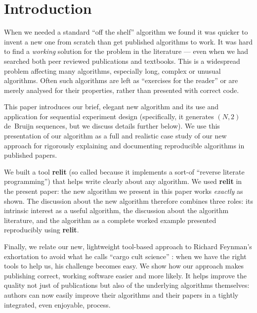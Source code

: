 \documentclass[preprint,times]{elsarticle}
\def\name#1{\textbf{#1}}
\begin{document}


\maketitle

\section{Introduction}
When we needed a standard ``off the shelf'' algorithm we found it was quicker to invent a new one from scratch than get published algorithms to work. It was hard to find a \emph{working\/} solution for the problem in the literature --- even when we had searched both peer reviewed publications and textbooks. This is a widespread problem affecting many algorithms, especially long, complex or unusual algorithms. Often such algorithms are left as ``exercises for the reader'' or are merely analysed for their properties, rather than presented with correct code.

This paper introduces our brief, elegant new algorithm and its use and application for sequential experiment design (specifically, it generates $(N,2)$ de~Bruijn sequences, but we discuss details further below). We use this presentation of our algorithm as a full and realistic case study of our new approach for rigorously explaining and documenting reproducible algorithms in published papers. 

We built a tool \name{relit} (so called because it implements a sort-of ``reverse literate programming'') that helps write clearly about any algorithm. We used \name{relit} in the present paper: the new algorithm we present in this paper works \emph{exactly\/} as shown. The discussion about the new algorithm therefore combines three roles: its intrinsic interest as a useful algorithm, the discussion about the algorithm literature, and the algorithm as a complete worked example presented reproducibly using \name{relit}.

Finally, we relate our new, lightweight tool-based approach to Richard Feynman's exhortation to avoid what he calls ``cargo cult science'' \cite{feynman}: when we have the right tools to help us, his challenge becomes easy. We show how our approach makes publishing correct, working software easier and more likely. It helps improve the quality not just of publications but also of the underlying algorithms themselves: authors can now easily improve their algorithms and their papers in a tightly integrated, even enjoyable, process.
\end{document}
